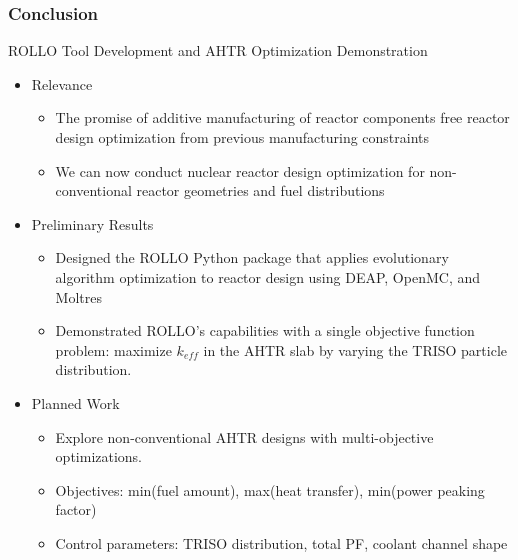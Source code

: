 \begin{frame}
    \frametitle{Conclusion}
    ROLLO Tool Development and AHTR 
    Optimization Demonstration
    \begin{itemize}
        \item Relevance
        \begin{itemize}
            \item The promise of additive manufacturing of reactor components 
            free reactor design optimization from previous manufacturing constraints
            \item We can now conduct nuclear reactor design optimization for 
            non-conventional reactor geometries and fuel distributions
        \end{itemize}
        \item Preliminary Results
        \begin{itemize}
            \item Designed the ROLLO Python package that applies 
            evolutionary algorithm optimization to reactor design using 
            DEAP, OpenMC, and Moltres
            \item Demonstrated ROLLO's capabilities with a single objective function 
            problem: maximize $k_{eff}$ in the AHTR slab by varying the 
            TRISO particle distribution. 
        \end{itemize} 
        \item Planned Work
        \begin{itemize}
            \item Explore non-conventional AHTR designs with multi-objective optimizations. 
            \item Objectives: min(fuel amount), max(heat transfer), min(power peaking factor) 
            \item Control parameters: TRISO distribution, total PF, coolant channel shape 
        \end{itemize}
    \end{itemize}
    \vspace{-0.4cm}
    \begin{figure}[]
        \centering
    \end{figure}
\end{frame}